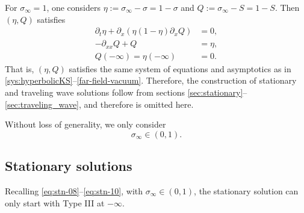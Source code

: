 \documentclass[12pt]{article}
\theoremstyle{definition}
\theoremstyle{remark}
\newcommand{\dt}{\partial_t}
\newcommand{\dx}{\partial_x}
\numberwithin{equation}{section}
\begin{document}
For $ \sigma_\infty = 1 $, 
one considers $ \eta:= \sigma_\infty - \sigma = 1 - \sigma $ and $ Q:= \sigma_\infty - S = 1 - S $. Then $ (\eta,  Q) $ satisfies
\begin{subequations}
    \begin{align}
        \dt \eta + \dx(\eta(1-\eta) \dx Q) & = 0, \\
        - \partial_{xx} Q + Q  & = \eta,\\
        Q(-\infty) = \eta(-\infty) & = 0.
    \end{align}
\end{subequations}
That is, $ (\eta, Q) $ satisfies the same system of equations and asymptotics as in \eqref{sys:hyperbolicKS}--\eqref{far-field-vacuum}. Therefore, the construction of stationary and traveling wave solutions follow from sections \ref{sec:stationary}--\ref{sec:traveling_wave}, and therefore is omitted here. 

Without loss of generality, we only consider 
\begin{equation}
    \label{eq:nv-far-field-000}
    \sigma_\infty \in (0,1).
\end{equation}

\subsection{Stationary solutions}
\label{subsec:station-non-vacuum-ff}
Recalling \eqref{eq:stn-08}--\eqref{eq:stn-10}, with $ \sigma_\infty \in (0,1) $, the stationary solution can only start with Type
III at $ - \infty $.

\end{document}
